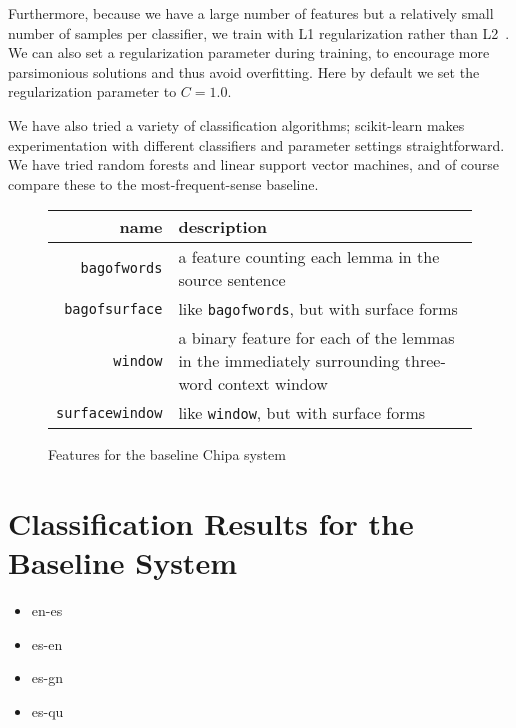 Furthermore, because we have a large number of features but a relatively small
number of samples per classifier, we train with L1 regularization rather than
L2~\cite{ng2004feature}.
We can also set a regularization parameter during training, to encourage
more parsimonious solutions and thus avoid overfitting.
Here by default we set the regularization parameter to $C=1.0$.


We have also tried a variety of classification algorithms; scikit-learn makes
experimentation with different classifiers and parameter settings
straightforward. We have tried random forests and linear support vector
machines, and of course compare these to the most-frequent-sense baseline.


\begin{figure*}
  \begin{centering}
  \begin{tabular}{|r|p{11cm}|}
    \hline
    name          & description  \\
    \hline
    \texttt{bagofwords}    & a feature counting each lemma in the source sentence \\
    \hline
    \texttt{bagofsurface}  & like \texttt{bagofwords}, but with surface forms \\
    \hline
    \texttt{window}       & a binary feature for each of the lemmas in the immediately surrounding three-word context window \\
    \hline
    \texttt{surfacewindow} & like \texttt{window}, but with surface forms \\
    \hline
  \end{tabular}
  \end{centering}
  \caption{Features for the baseline Chipa system}
  \label{fig:baselinefeatures}
\end{figure*}

\section{Classification Results for the Baseline System}


\begin{itemize}
\item en-es
\item es-en
\item es-gn
\item es-qu
\end{itemize}

